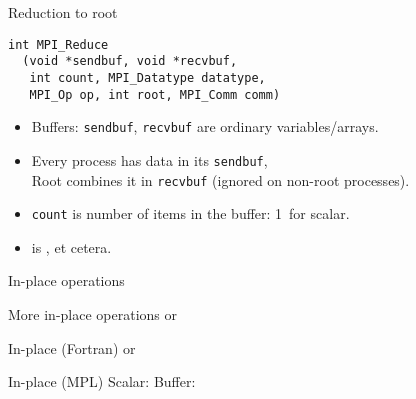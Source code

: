\begin{numberedframe}{Reduction to root}
\lstset{language=C}
\begin{lstlisting}
int MPI_Reduce
  (void *sendbuf, void *recvbuf,
   int count, MPI_Datatype datatype, 
   MPI_Op op, int root, MPI_Comm comm)
\end{lstlisting}
\begin{itemize}
\item Buffers: \lstinline{sendbuf}, \lstinline{recvbuf} are ordinary variables/arrays.
\item Every process has data in its \lstinline{sendbuf},\\
  Root combines it in \lstinline{recvbuf} (ignored on non-root processes).
\item \lstinline{count} is number of items in the buffer: 1~for scalar.
\item {} is ,  et cetera.
\end{itemize}
\end{numberedframe}

\begin{numberedframe}{In-place operations}
\end{numberedframe}

\begin{numberedframe}{More in-place operations}
  or
\end{numberedframe}

\begin{fortran}
  \addtocounter{slidecount}{-1}
\begin{numberedframe}{In-place (Fortran)}
  or
\end{numberedframe}
\end{fortran}

\begin{mpl}
  \addtocounter{slidecount}{-1}
\begin{numberedframe}{In-place (MPL)}
  Scalar:
  Buffer:
\end{numberedframe}
\end{mpl}

